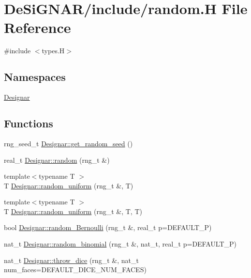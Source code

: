 \hypertarget{random_8_h}{}\section{De\+Si\+G\+N\+A\+R/include/random.H File Reference}
\label{random_8_h}
{\ttfamily \#include $<$types.\+H$>$}\newline
\subsection*{Namespaces}
\begin{DoxyCompactItemize}
\item 
 \hyperlink{namespace_designar}{Designar}
\end{DoxyCompactItemize}
\subsection*{Functions}
\begin{DoxyCompactItemize}
\item 
rng\+\_\+seed\+\_\+t \hyperlink{namespace_designar_a39f540907bf568cf8e9983cffbc5246c}{Designar\+::get\+\_\+random\+\_\+seed} ()
\item 
real\+\_\+t \hyperlink{namespace_designar_ae380ee144e16364a26bec38110ac58cc}{Designar\+::random} (rng\+\_\+t \&)
\item 
{\footnotesize template$<$typename T $>$ }\\T \hyperlink{namespace_designar_a1ac1e0ffd178b0439770840ea75144e0}{Designar\+::random\+\_\+uniform} (rng\+\_\+t \&, T)
\item 
{\footnotesize template$<$typename T $>$ }\\T \hyperlink{namespace_designar_a7b0ea319994973073cc92067730c1c1c}{Designar\+::random\+\_\+uniform} (rng\+\_\+t \&, T, T)
\item 
bool \hyperlink{namespace_designar_adf6febbe5fa0abe44ea554203b767685}{Designar\+::random\+\_\+\+Bernoulli} (rng\+\_\+t \&, real\+\_\+t p=D\+E\+F\+A\+U\+L\+T\+\_\+P)
\item 
nat\+\_\+t \hyperlink{namespace_designar_a4f786bd2e0e15f81f468cf60b3a1d9fb}{Designar\+::random\+\_\+binomial} (rng\+\_\+t \&, nat\+\_\+t, real\+\_\+t p=D\+E\+F\+A\+U\+L\+T\+\_\+P)
\item 
nat\+\_\+t \hyperlink{namespace_designar_a29b53c8e7dfb33209e0a79ad167b6803}{Designar\+::throw\+\_\+dice} (rng\+\_\+t \&, nat\+\_\+t num\+\_\+faces=D\+E\+F\+A\+U\+L\+T\+\_\+\+D\+I\+C\+E\+\_\+\+N\+U\+M\+\_\+\+F\+A\+C\+ES)
\end{DoxyCompactItemize}
